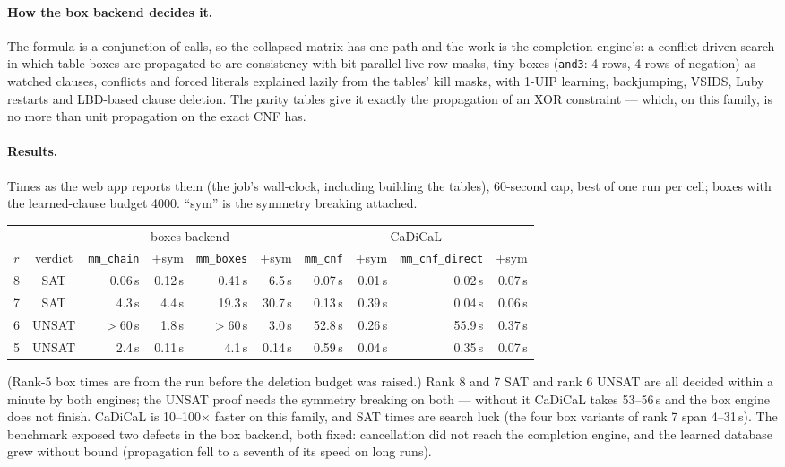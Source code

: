 \documentclass[10pt]{article}
\begin{document}
\paragraph{How the box backend decides it.}
The formula is a conjunction of calls, so the collapsed matrix has one
path and the work is the completion engine's: a conflict-driven search in
which table boxes are propagated to arc consistency with bit-parallel
live-row masks, tiny boxes (\texttt{and3}: 4 rows, 4 rows of negation) as
watched clauses, conflicts and forced literals explained lazily from the
tables' kill masks, with 1-UIP learning, backjumping, VSIDS, Luby restarts
and LBD-based clause deletion. The parity tables give it exactly the
propagation of an XOR constraint --- which, on this family, is no more
than unit propagation on the exact CNF has.

\paragraph{Results.}
Times as the web app reports them (the job's wall-clock, including
building the tables), 60-second cap, best of one run per cell; boxes with
the learned-clause budget 4000. ``sym'' is the symmetry breaking attached.
\begin{center}
\small
\begin{tabular}{@{}c c rrrr rrrr@{}}
\toprule
& & \multicolumn{4}{c}{boxes backend} & \multicolumn{4}{c}{CaDiCaL} \\
\cmidrule(lr){3-6}\cmidrule(lr){7-10}
$r$ & verdict & \texttt{mm\_chain} & +sym & \texttt{mm\_boxes} & +sym & \texttt{mm\_cnf} & +sym & \texttt{mm\_cnf\_direct} & +sym \\
\midrule
8 & SAT   & 0.06\,s & 0.12\,s & 0.41\,s & 6.5\,s  & 0.07\,s & 0.01\,s & 0.02\,s & 0.07\,s \\
7 & SAT   & 4.3\,s  & 4.4\,s  & 19.3\,s & 30.7\,s & 0.13\,s & 0.39\,s & 0.04\,s & 0.06\,s \\
6 & UNSAT & $>60$\,s & 1.8\,s & $>60$\,s & 3.0\,s & 52.8\,s & 0.26\,s & 55.9\,s & 0.37\,s \\
5 & UNSAT & 2.4\,s  & 0.11\,s & 4.1\,s  & 0.14\,s & 0.59\,s & 0.04\,s & 0.35\,s & 0.07\,s \\
\bottomrule
\end{tabular}
\end{center}
(Rank-5 box times are from the run before the deletion budget was raised.)
Rank 8 and 7 SAT and rank 6 UNSAT are all decided within a minute by both
engines; the UNSAT proof needs the symmetry breaking on both --- without
it CaDiCaL takes 53--56\,s and the box engine does not finish. CaDiCaL is
10--100$\times$ faster on this family, and SAT times are search luck (the
four box variants of rank 7 span 4--31\,s). The benchmark exposed two
defects in the box backend, both fixed: cancellation did not reach the
completion engine, and the learned database grew without bound
(propagation fell to a seventh of its speed on long runs).
\end{document}
